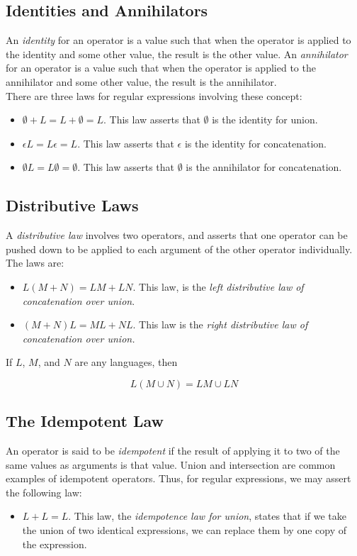 \documentclass[]{article}
\begin{document}
  \subsection*{Identities and Annihilators}
    An \emph{identity} for an operator is a value such that when the operator is
    applied to the identity and some other value, the result is the other value.
    An \emph{annihilator} for an operator is a value such that when the operator
    is applied to the annihilator and some other value, the result is the
    annihilator. \\
    \indent There are three laws for regular expressions involving these
    concept:
      \begin{itemize}
        \item $\emptyset + L = L + \emptyset = L$. This law asserts that
        $\emptyset$ is the identity for union.
        \item $\epsilon{L} = L\epsilon = L$. This law asserts that $\epsilon$ is
        the identity for concatenation.
        \item $\emptyset{L} = L\emptyset = \emptyset$. This law asserts that $
        \emptyset$ is the annihilator for concatenation.
      \end{itemize}

  \subsection*{Distributive Laws}
    A \emph{distributive law} involves two operators, and asserts that one
    operator can be pushed down to be applied to each argument of the other
    operator individually. The laws are:
    \begin{itemize}
      \item $L(M + N) = LM + LN$. This law, is the \emph{left distributive law
      of concatenation over union}.
      \item $(M + N)L = ML + NL$. This law is the \emph{right distributive law
      of concatenation over union.}
    \end{itemize}
    \begin{thm}
      If $L$, $M$, and $N$ are any languages, then

        \[ L(M \cup N) = LM \cup LN \]

    \end{thm}

  \subsection*{The Idempotent Law}
    An operator is said to be \emph{idempotent} if the result of applying it to
    two of the same values as arguments is that value. Union and intersection
    are common examples of idempotent operators. Thus, for regular expressions,
    we may assert the following law:
    \begin{itemize}
      \item $L + L = L$. This law, the \emph{idempotence law for union},
      states that if we take the union of two identical expressions, we can
      replace them by one copy of the expression.
    \end{itemize}
\end{document}
